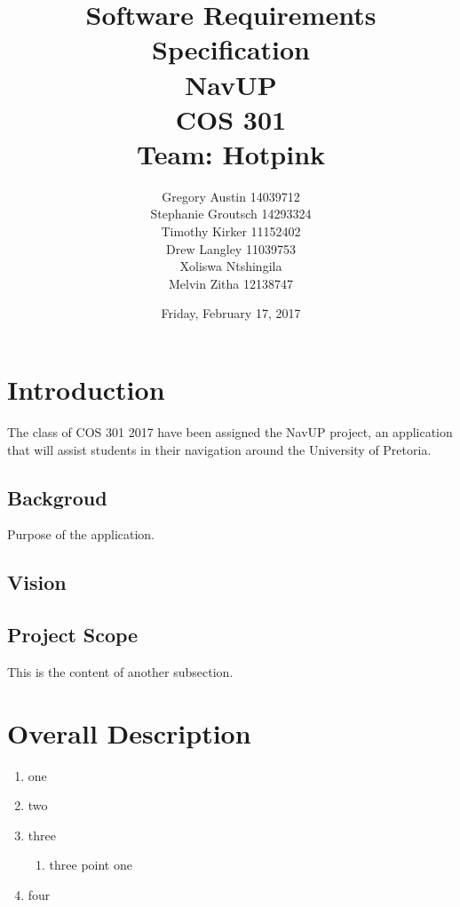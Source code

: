 \documentclass[12pt,a4paper]{report}
\title{Software Requirements Specification \\ NavUP \\ COS 301 \\ Team: Hotpink}
\date{Friday, February 17, 2017}
\author{Gregory Austin 14039712 \\ Stephanie Groutsch 14293324 \\ Timothy Kirker 11152402 \\ Drew Langley 11039753 \\ Xoliswa Ntshingila %
\\ Melvin Zitha 12138747}
\begin{document}
\maketitle



\newpage
\section*{Introduction}
The class of COS 301 2017 have been assigned the NavUP project, an application that will assist students in their navigation around the University of Pretoria.

	\subsection*{Backgroud}
		Purpose of the application.
		
	\subsection*{Vision}
		
		
	\subsection*{Project Scope}
		This is the content of another subsection.
		

\newpage
\section*{Overall Description}
\begin{enumerate}
\renewcommand{\labelenumi}{{\textbf{\arabic{enumi}.}}}
\item one
\item two
\item three
   \begin{enumerate}
   \renewcommand{\labelenumii}{\textbf{\arabic{enumi}.\arabic{enumii}.}}
   \item three point one
   \end{enumerate}
\item four
\end{enumerate}
\end{document}
